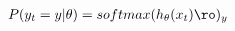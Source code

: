 \documentclass[preview]{standalone}
\begin{document}
\begin{align*}
P(y_t = y | \theta) = softmax(h_{\theta}(x_t) \ro)_y
\end{align*}
\end{document}
